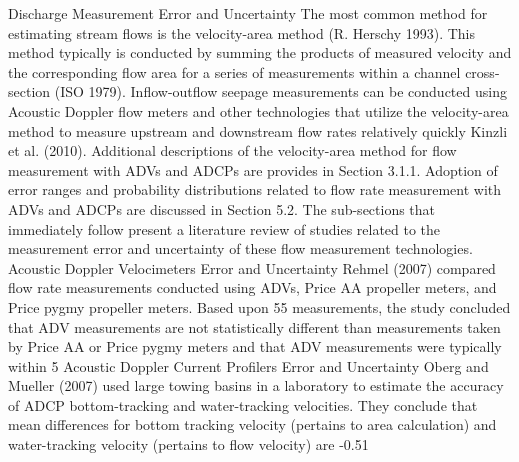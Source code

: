 \begin{linenumbers}
Discharge Measurement Error and Uncertainty
The most common method for estimating stream flows is the velocity-area method (R. Herschy 1993).  This method typically is conducted by summing the products of measured velocity and the corresponding flow area for a series of measurements within a channel cross-section (ISO 1979).  Inflow-outflow seepage measurements can be conducted using Acoustic Doppler flow meters and other technologies that utilize the velocity-area method to measure upstream and downstream flow rates relatively quickly Kinzli et al. (2010).  Additional descriptions of the velocity-area method for flow measurement with ADVs and ADCPs are provides in Section 3.1.1.  Adoption of error ranges and probability distributions related to flow rate measurement with ADVs and ADCPs are discussed in Section 5.2.  The sub-sections that immediately follow present a literature review of studies related to the measurement error and uncertainty of these flow measurement technologies.  
Acoustic Doppler Velocimeters Error and Uncertainty
Rehmel (2007) compared flow rate measurements conducted using ADVs, Price AA propeller meters, and Price pygmy propeller meters.  Based upon 55 measurements, the study concluded that ADV measurements are not statistically different than measurements taken by Price AA or Price pygmy meters and that ADV measurements were typically within 5%
Acoustic Doppler Current Profilers Error and Uncertainty
Oberg and Mueller (2007) used large towing basins in a laboratory to estimate the accuracy of ADCP bottom-tracking and water-tracking velocities.  They conclude that mean differences for bottom tracking velocity (pertains to area calculation) and water-tracking velocity (pertains to flow velocity) are -0.51%

\end{linenumbers}

